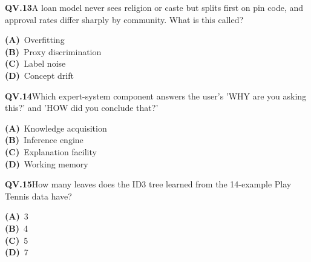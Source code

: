 \begin{tcolorbox}[enhanced,breakable,colback=white,colframe=navyL,arc=2mm,boxrule=0.7pt,left=3mm,right=3mm,top=2mm,bottom=2mm]
\textbf{\color{navy}QV.13}\quad A loan model never sees religion or caste but splits first on pin code, and approval rates differ sharply by community. What is this called?\hfill{}\par\smallskip
{\small \textbf{\color{navyL}(A)}\ Overfitting\\[1pt]\textbf{\color{navyL}(B)}\ Proxy discrimination\\[1pt]\textbf{\color{navyL}(C)}\ Label noise\\[1pt]\textbf{\color{navyL}(D)}\ Concept drift}
\end{tcolorbox}
\begin{tcolorbox}[enhanced,breakable,colback=white,colframe=navyL,arc=2mm,boxrule=0.7pt,left=3mm,right=3mm,top=2mm,bottom=2mm]
\textbf{\color{navy}QV.14}\quad Which expert-system component answers the user's 'WHY are you asking this?' and 'HOW did you conclude that?'\hfill{}\par\smallskip
{\small \textbf{\color{navyL}(A)}\ Knowledge acquisition\\[1pt]\textbf{\color{navyL}(B)}\ Inference engine\\[1pt]\textbf{\color{navyL}(C)}\ Explanation facility\\[1pt]\textbf{\color{navyL}(D)}\ Working memory}
\end{tcolorbox}
\begin{tcolorbox}[enhanced,breakable,colback=white,colframe=navyL,arc=2mm,boxrule=0.7pt,left=3mm,right=3mm,top=2mm,bottom=2mm]
\textbf{\color{navy}QV.15}\quad How many leaves does the ID3 tree learned from the 14-example Play Tennis data have?\hfill{}\par\smallskip
{\small \textbf{\color{navyL}(A)}\ 3\\[1pt]\textbf{\color{navyL}(B)}\ 4\\[1pt]\textbf{\color{navyL}(C)}\ 5\\[1pt]\textbf{\color{navyL}(D)}\ 7}
\end{tcolorbox}
\newpage
